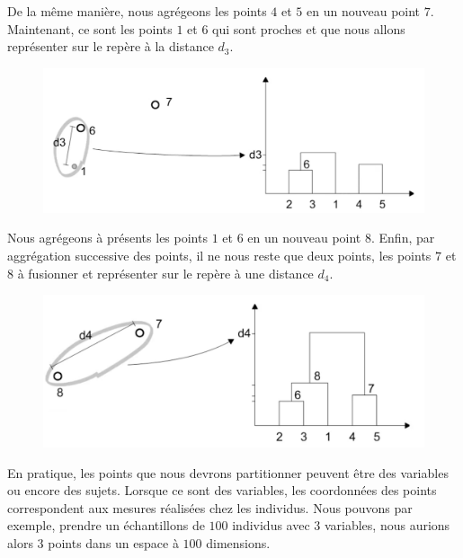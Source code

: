 De la même manière, nous agrégeons les points $4$ et $5$ en un nouveau point $7$.\newline
Maintenant, ce sont les points $1$ et $6$ qui sont proches et que nous allons représenter sur le repère à la distance $d_{3}$.

\begin{figure}[H]\begin{center}\includegraphics[scale=0.5]{ilu/ClassHierarConstruc4.png}\end{center}\end{figure}

Nous agrégeons à présents les points $1$ et $6$ en un nouveau point $8$.\newline
Enfin, par aggrégation successive des points, il ne nous reste que deux points, les points $7$ et $8$ à fusionner et représenter sur le repère à une distance $d_{4}$.

\begin{figure}[H]\begin{center}\includegraphics[scale=0.5]{ilu/ClassHierarConstruc5.png}\end{center}\end{figure}

En pratique, les points que nous devrons partitionner peuvent être des variables ou encore des sujets.\newline
Lorsque ce sont des variables, les coordonnées des points correspondent aux mesures réalisées chez les individus. Nous pouvons par exemple, prendre un échantillons de $100$ individus avec $3$ variables, nous aurions alors $3$ points dans un espace à $100$ dimensions.

